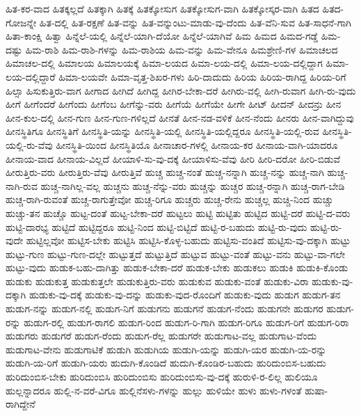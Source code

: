 {ಹಿತ-ಕರ-ವಾದ
ಹಿತಕ್ಕಲ್ಲದೆ
ಹಿತಕ್ಕಾಗಿ
ಹಿತಕ್ಕೆ
ಹಿತಕ್ಕೋಸುಗ
ಹಿತಕ್ಕೋಸುಗ-ವಾಗಿ
ಹಿತಕ್ಕೋಸ್ಕರ-ವಾಗಿ
ಹಿತದ
ಹಿತದ-ಗೋಜನ್ನೇ
ಹಿತ-ದಲ್ಲಿ
ಹಿತ-ರಕ್ಷಣೆ
ಹಿತ-ವನ್ನು
ಹಿತ-ವನ್ನುಂಟು-ಮಾಡು-ವು-ದೆಂದು
ಹಿತ-ವೆನಿ-ಸುವ
ಹಿತ-ಸಾಧನೆ-ಗಾಗಿ
ಹಿತಾ-ಕಾಂಕ್ಷಿ
ಹಿತ್ವಾ
ಹಿನ್ನೆಲೆ-ಯಲ್ಲಿ
ಹಿನ್ನೆಲೆ-ಯಾಗಿ-ದೆಯೋ
ಹಿನ್ನೆಲೆ-ಯಾಗಿವೆ
ಹಿಮ
ಹಿಮದ
ಹಿಮದ-ಗಡ್ಡೆ
ಹಿಮ-ದಷ್ಟು
ಹಿಮ-ರಾಶಿ
ಹಿಮ-ರಾಶಿ-ಗಳನ್ನು
ಹಿಮ-ರಾಶಿಯ
ಹಿಮ-ವನ್ನು
ಹಿಮ-ವೇನೂ
ಹಿಮಶ್ರೇಣಿ-ಗಳ
ಹಿಮಾಚಲದ
ಹಿಮಾಚಲ-ದಲ್ಲಿ
ಹಿಮಾಲಯ
ಹಿಮಾಲಯಕ್ಕೆ
ಹಿಮಾ-ಲಯದ
ಹಿಮಾ-ಲಯ-ದಲ್ಲಿ
ಹಿಮಾ-ಲಯ-ದಲ್ಲಿದ್ದಾಗ
ಹಿಮಾ-ಲಯ-ದಲ್ಲಿದ್ದಾರೆ
ಹಿಮಾ-ಲಯವೇ
ಹಿಮಾ-ವೃತ್ತ-ಶಿಖರ-ಗಳು
ಹಿರಿ-ದಾದುದು
ಹಿರಿಯ
ಹಿರಿಯ-ರಾಗಿದ್ದ
ಹಿರಿಯ-ರಿಗೆ
ಹಿಲ್ಸಾ
ಹಿಸುಕುತ್ತಿರು-ವಾಗ
ಹೀಗಾದ
ಹೀಗಿದೆ
ಹೀಗಿದ್ದ
ಹೀಗಿರ-ಬೇಕಾ-ದರೆ
ಹೀಗಿರು-ವಲ್ಲಿ
ಹೀಗಿ-ರುವಾಗ
ಹೀಗಿ-ರು-ವುದು
ಹೀಗೆ
ಹೀಗೆಂದರೆ
ಹೀಗೆಂದು
ಹೀಗೆಂಬ
ಹೀಗೆನ್ನು-ವರು
ಹೀಗೆಯೆ
ಹೀಗೆಯೇ
ಹೀಗೇ
ಹೀಟ್
ಹೀದನ್
ಹೀದನ್ರು
ಹೀನ
ಹೀನ-ಕುಲ-ದಲ್ಲಿ
ಹೀನ-ಗುಣ
ಹೀನ-ಗುಣ-ಗಳಿಲ್ಲದೆ
ಹೀನತೆ
ಹೀನ-ನಡ-ವಳಿಕೆ
ಹೀನ-ನೆಂದು
ಹೀನರು
ಹೀನ-ವಾಗಿದ್ದುವು
ಹೀನಸ್ಥಿತಿಗೂ
ಹೀನಸ್ಥಿತಿಗೆ
ಹೀನಸ್ಥಿತಿ-ಯನ್ನು
ಹೀನಸ್ಥಿತಿ-ಯಲ್ಲಿ
ಹೀನಸ್ಥಿತಿ-ಯಲ್ಲಿದ್ದರೂ
ಹೀನಸ್ಥಿತಿ-ಯಲ್ಲಿ-ರುವ
ಹೀನಸ್ಥಿತಿ-ಯಲ್ಲಿ-ರು-ವೆವು
ಹೀನಸ್ಥಿತಿ-ಯಿಂದ
ಹೀನಸ್ಥಿತಿಯೊ
ಹೀನಾಚಾರ-ಗಳಲ್ಲಿ
ಹೀನಾಯ-ಕರ
ಹೀನಾಯ-ವಾಗಿ-ಯಾದರೂ
ಹೀನಾಯ-ವಾದ
ಹೀನಾಯ-ವಿಲ್ಲದೆ
ಹೀಯಾಳಿ-ಸು-ವು-ದಕ್ಕೆ
ಹೀಯಾಳಿಸು-ವೆವು
ಹೀರಿ
ಹೀರಿ-ದರೋ
ಹೀರಿ-ಬಿಡುವೆ
ಹೀರುತ್ತಿರು-ವರು
ಹೀರುತ್ತಿರು-ವೆವು
ಹೀರುತ್ತಿವೆ
ಹುಚ್ಚ
ಹುಚ್ಚ-ನಂತೆ
ಹುಚ್ಚ-ನನ್ನಾಗಿ
ಹುಚ್ಚ-ನನ್ನು
ಹುಚ್ಚ-ನಾಗಿ
ಹುಚ್ಚ-ನಾಗಿ-ರುವ
ಹುಚ್ಚ-ನಾಗಿಲ್ಲ-ವಲ್ಲ
ಹುಚ್ಚನು
ಹುಚ್ಚ-ನೆನ್ನು-ವರು
ಹುಚ್ಚನ್ನು
ಹುಚ್ಚರ
ಹುಚ್ಚ-ರನ್ನಾಗಿ
ಹುಚ್ಚ-ರಾಗ-ಬೇಡಿ
ಹುಚ್ಚ-ರಾಗಿ-ರುವಂತೆ
ಹುಚ್ಚ-ರಾಗುತ್ತೇವೋ
ಹುಚ್ಚ-ರಿಗೂ
ಹುಚ್ಚರು
ಹುಚ್ಚ-ರೇನು
ಹುಚ್ಚಲ್ಲ
ಹುಚ್ಚಿ-ನಿಂದ
ಹುಚ್ಚು
ಹುಚ್ಚು-ತನ
ಹುಚ್ಚೊ
ಹುಟ್ಟ-ದಂತೆ
ಹುಟ್ಟ-ಬೇಕಾ-ದರೆ
ಹುಟ್ಟಲು
ಹುಟ್ಟಿ
ಹುಟ್ಟಿತು
ಹುಟ್ಟಿದ
ಹುಟ್ಟಿ-ದರೆ
ಹುಟ್ಟಿ-ದ-ವರು
ಹುಟ್ಟಿ-ದಾರಭ್ಯ
ಹುಟ್ಟಿದೆ
ಹುಟ್ಟಿದ್ದರೂ
ಹುಟ್ಟಿ-ನಿಂದ
ಹುಟ್ಟಿ-ಬಿಟ್ಟಿದೆ
ಹುಟ್ಟಿ-ರ-ಬಹುದು
ಹುಟ್ಟಿ-ರು-ವುದು
ಹುಟ್ಟಿ-ರು-ವುದೇ
ಹುಟ್ಟಿಲ್ಲವೋ
ಹುಟ್ಟಿಸ-ಬೇಕು
ಹುಟ್ಟಿಸಿ
ಹುಟ್ಟಿಸಿ-ಕೊಳ್ಳ-ಬಹುದು
ಹುಟ್ಟಿಸು-ವಂತಿದೆ
ಹುಟ್ಟಿಸು-ವು-ದಕ್ಕಾಗಿ
ಹುಟ್ಟು
ಹುಟ್ಟು-ಗುಣ
ಹುಟ್ಟು-ಗುಣ-ದಲ್ಲೇ
ಹುಟ್ಟುತ್ತದೆ
ಹುಟ್ಟುತ್ತಿದೆ
ಹುಟ್ಟುವ
ಹುಟ್ಟು-ವಂತೆ
ಹುಟ್ಟು-ವನು
ಹುಟ್ಟು-ವಾ-ಗಲೇ
ಹುಟ್ಟು-ವುದು
ಹುಡುಕ-ಬಹು-ದಾಗಿತ್ತು
ಹುಡುಕ-ಬೇಕಾ-ದರೆ
ಹುಡುಕ-ಬೇಕು
ಹುಡುಕಲು
ಹುಡುಕಿ
ಹುಡುಕಿ-ಕೊಂಡು
ಹುಡುಕು
ಹುಡುಕುತ್ತ
ಹುಡುಕುತ್ತಲೇ
ಹುಡುಕುತ್ತಿರು-ವರು
ಹುಡುಕುವ
ಹುಡುಕು-ವಂತೆ
ಹುಡುಕು-ವಿರಾ
ಹುಡುಕು-ವು-ದಕ್ಕಾಗಿ
ಹುಡುಕು-ವು-ದಕ್ಕೆ
ಹುಡುಕು-ವು-ದನ್ನು
ಹುಡುಕು-ವುದ-ರೊಂದಿಗೆ
ಹುಡುಕು-ವುದು
ಹುಡುಗ
ಹುಡುಗ-ತನ
ಹುಡುಗ-ನನ್ನು
ಹುಡುಗ-ನಲ್ಲಿ
ಹುಡುಗ-ನಿಗೆ
ಹುಡುಗನು
ಹುಡುಗನೆ
ಹುಡುಗ-ನೆಂದು
ಹುಡುಗನೇ
ಹುಡುಗರ
ಹುಡುಗ-ರನ್ನು
ಹುಡುಗ-ರಲ್ಲಿ
ಹುಡುಗ-ರಾಗಲಿ
ಹುಡುಗ-ರಿಂದ
ಹುಡುಗ-ರಿ-ಗಾಗಿ
ಹುಡುಗ-ರಿಗೂ
ಹುಡುಗ-ರಿಗೆ
ಹುಡುಗ-ರಿರಾ
ಹುಡುಗರು
ಹುಡುಗರೆ
ಹುಡುಗ-ರೆಂದು
ಹುಡುಗ-ರೆಲ್ಲ
ಹುಡುಗರೇ
ಹುಡುಗಾಟ-ವಲ್ಲ
ಹುಡುಗಾಟ-ವೆಂದು
ಹುಡುಗಾಟ-ವೇನು
ಹುಡುಗಾಟಿಕೆ
ಹುಡುಗಿ
ಹುಡುಗಿಯ
ಹುಡುಗಿ-ಯನ್ನು
ಹುಡುಗಿ-ಯರ
ಹುಡುಗಿ-ಯ-ರನ್ನು
ಹುಡುಗಿ-ಯ-ರಿಗೆ
ಹುಡುಗಿ-ಯರು
ಹುದುಗಿ-ಕೊಂಡಿದೆ
ಹುದುಗಿ-ಕೊಂಡಿರ-ಬಹುದು
ಹುರಿದುಂಬಿಸ-ಬಹುದು
ಹುರಿದುಂಬಿಸ-ಬೇಕು
ಹುರಿದುಂಬಿಸಿ
ಹುರಿದುಂಬಿಸು
ಹುರಿದುಂಬಿಸು-ವು-ದಕ್ಕೆ
ಹುರುಳಿ-ರ-ಲಿಲ್ಲ
ಹುಲಿಯೂ
ಹುಲ್ಲನ್ನಾದರೂ
ಹುಲ್ಲಿ-ನ-ವರೆ-ವಿಗೂ
ಹುಲ್ಲಿನೆಸಳು-ಗಳನ್ನು
ಹುಲ್ಲು
ಹುಳಿಯೇ
ಹುಳು
ಹುಳು-ಗಳಂತೆ
ಹುಷಾ-ರಾಗಿದ್ದೇನೆ
}
